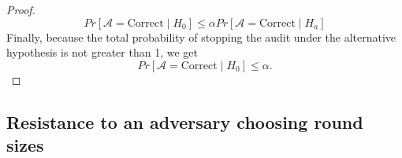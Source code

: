 \begin{proof}
$$
Pr[\mathcal{A}=\text{Correct} \mid H_0]
\le
\alpha Pr[\mathcal{A}=\text{Correct} \mid H_a]
$$
Finally, because the total probability of stopping the audit under
the alternative hypothesis is not greater than 1, we get
$$
Pr[\mathcal{A}=\text{Correct} \mid H_0] \le
\alpha.
$$
\end{proof}

\subsection{Resistance to an adversary choosing round sizes}
\label{sec:adversary}

